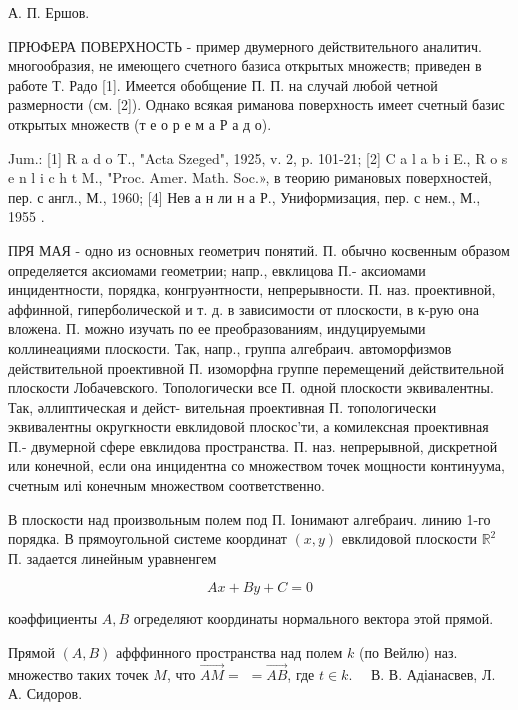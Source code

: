 \documentclass[10pt]{article}
\begin{document}
А. П. Ершов.



ПРЮФЕРА ПОВЕРХНОСТЬ - пример двумерного действительного аналитич. многообразия, не имеющего счетного базиса открытых множеств; приведен в работе Т. Радо [1]. Имеется обобщение П. П. на случай любой четной размерности (см. [2]). Однако всякая риманова поверхность имеет счетный базис открытых множеств (т е о р е м а Р а д о).



Jum.: [1] R a d o T., "Acta Szeged", 1925, v. 2, p. 101-21; [2] C a l a b i E., R o s e n l i c h t M., "Proc. Amer. Math. Soc.», в теорию римановых поверхностей, пер. с англ., М., 1960; [4] Нев а н ли н а Р., Униформизация, пер. с нем., М., 1955 .



ПРЯ МАЯ - одно из основных геометрич понятий. П. обычно косвенным образом определяется аксиомами геометрии; напр., евклицова П.- аксиомами инцидентности, порядка, конгруәнтности, непрерывности. П. наз. проективной, аффинной, гиперболической и т. д. в зависимости от плоскости, в к-рую она вложена. П. можно изучать по ее преобразованиям, индуцируемыми коллинеациями плоскости. Так, напр., группа алгебраич. автоморфизмов действительной проективной П. изоморфна группе перемещений действительной плоскости Лобачевского. Топологически все П. одной плоскости эквивалентны. Так, әллиптическая и дейст- вительная проективная П. топологически эквивалентны округкности евклидовой плоскос'ти, а комилексная проективная П.- двумерной сфере евклидова пространства. П. наз. непрерывной, дискретной или конечной, если она инцидентна со множеством точек мощности континуума, счетным илі конечным множеством соответственно.



В плоскости над произвольным полем под П. Іонимают алгебраич. линию 1-го порядка. В прямоугольной системе координат $(x, y)$ евклидовой плоскости $\mathbb{R}^{2}$ П. задается линейным уравненгем



\[

A x+B y+C=0

\]



коәффициенты $A, B$ огределяют координаты нормального вектора этой прямой.



Прямой $(A, B)$ афффинного пространства над полем $k$ (по Вейлю) наз. множество таких точек $M$, что $\overrightarrow{A M}=$ $=\overrightarrow{A B}$, где $t \in k . \quad$ В. В. Адіанасвев, Л. А. Сидоров.
\end{document}
